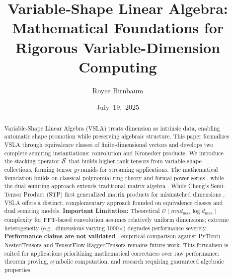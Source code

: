 \documentclass[11pt]{article}
\title{Variable‑Shape Linear Algebra: Mathematical Foundations for Rigorous Variable-Dimension Computing}
\author{Royce Birnbaum}
\date{July 19, 2025}
\begin{document}
\maketitle

\begin{abstract}
Variable‑Shape Linear Algebra (VSLA) treats dimension as intrinsic data, enabling automatic shape promotion while preserving algebraic structure. This paper formalizes VSLA through equivalence classes of finite‑dimensional vectors and develops two complete semiring instantiations: convolution and Kronecker products. We introduce the stacking operator $\mathcal{S}$ that builds higher-rank tensors from variable-shape collections, forming tensor pyramids for streaming applications. The mathematical foundation builds on classical polynomial ring theory and formal power series \cite{VonZurGathenGerhard2013}, while the dual semiring approach extends traditional matrix algebra \cite{HornJohnson2012,GondranMinoux2008}. While Cheng's Semi-Tensor Product (STP) first generalized matrix products for mismatched dimensions \cite{Cheng2001}, VSLA offers a distinct, complementary approach founded on equivalence classes and dual semiring models. \textbf{Important Limitation:} Theoretical $\mathcal{O}(mn d_{\max} \log d_{\max})$ complexity for FFT-based convolution assumes relatively uniform dimensions; extreme heterogeneity (e.g., dimensions varying 1000×) degrades performance severely. \textbf{Performance claims are not validated} - empirical comparison against PyTorch NestedTensors and TensorFlow RaggedTensors remains future work. This formalism is suited for applications prioritizing mathematical correctness over raw performance: theorem proving, symbolic computation, and research requiring guaranteed algebraic properties.
\end{abstract}

\vspace{0.5em}
\noindent{}

\vspace{1em}
\noindent{}



















\end{document}
